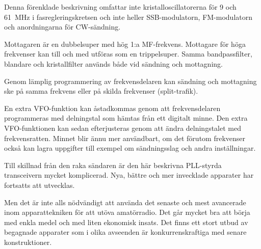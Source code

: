 Denna förenklade beskrivning omfattar inte kristalloscillatorerna för 9 och
\qty{61}{\mega\hertz} i fasregleringskretsen och inte heller SSB-modulatorn,
FM-modulatorn och anordningarna för CW-sändning.

Mottagaren är en dubbelsuper med hög 1:a MF-frekvens.
Mottagare för höga frekvenser kan till och med utföras som en trippelsuper.
Samma bandpassfilter, blandare och kristallfilter används både vid sändning
och mottagning.

Genom lämplig programmering av frekvensdelaren kan sändning och
mottagning ske på samma frekvens eller på skilda frekvenser
(split-trafik).

En extra VFO-funktion kan åstadkommas genom att frekvensdelaren
programmeras med delningstal som hämtas från ett digitalt minne.
Den extra VFO-funktionen kan sedan efterjusteras genom att ändra
delningstalet med frekvensratten.
Minnet blir ännu mer användbart, om det förutom frekvenser också kan lagra
uppgifter till exempel om sändningsslag och andra inställningar.

Till skillnad från den raka sändaren är den här beskrivna PLL-styrda
transceivern mycket komplicerad.
Nya, bättre och mer invecklade apparater har fortsatts att utvecklas.

Men det är inte alls nödvändigt att använda det senaste och mest avancerade inom
apparattekniken för att utöva amatörradio.
Det går mycket bra att börja med enkla medel och med liten ekonomisk insats.
Det finns ett stort utbud av begagnade apparater som i olika avseenden
är konkurrenskraftiga med senare konstruktioner.
